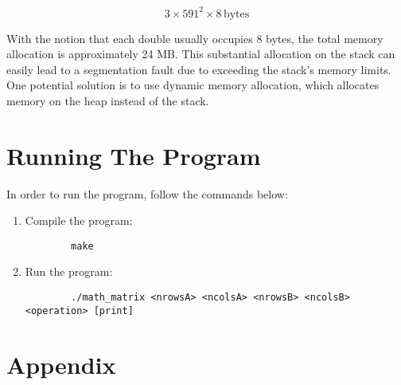 \documentclass[a4paper]{article}
\begin{document}
\[ 3 \times 591^2 \times 8 \, \text{bytes} \]

With the notion that each double usually occupies 8 bytes, the total memory allocation is approximately 24 MB. This substantial allocation on the stack can easily lead to a segmentation fault due to exceeding the stack's memory limits. One potential solution is to use dynamic memory allocation, which allocates memory on the heap instead of the stack.

\section{Running The Program}

In order to run the program, follow the commands below:

\begin{enumerate}
    \item Compile the program:
    \begin{verbatim}
        make
    \end{verbatim}
    
    \item Run the program:
    \begin{verbatim}
        ./math_matrix <nrowsA> <ncolsA> <nrowsB> <ncolsB> <operation> [print]
    \end{verbatim}
\end{enumerate}

\section{Appendix}




\end{document}
